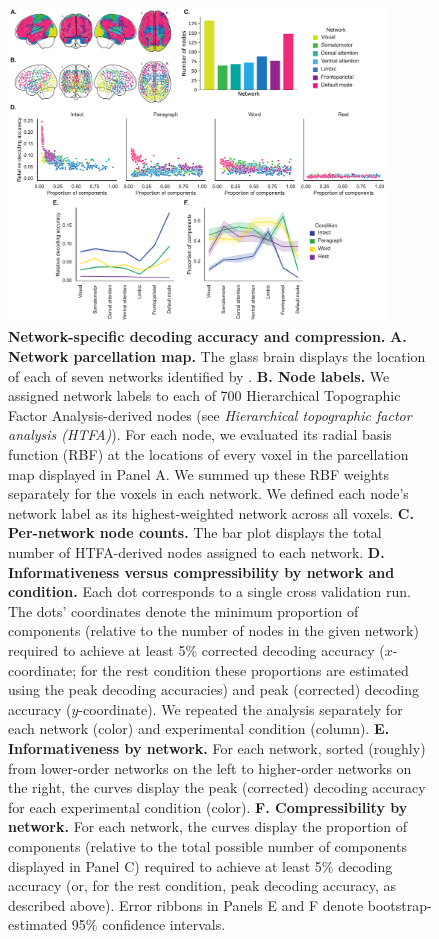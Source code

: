 \documentclass[english, 11pt]{article}
\begin{document}
\begin{figure}[tp]
  \centering
  \includegraphics[width=0.9\textwidth]{figs/network_results}

  \caption{\textbf{Network-specific decoding accuracy and compression.}
  \textbf{A. Network parcellation map.} The glass brain displays the location
  of each of seven networks identified by \cite{YeoEtal11}. \textbf{B. Node
  labels.} We assigned network labels to each of 700 Hierarchical Topographic
  Factor Analysis-derived nodes (see \textit{Hierarchical topographic factor
  analysis (HTFA)}). For each node, we evaluated its radial basis function
  (RBF) at the locations of every voxel in the parcellation map displayed in
  Panel A. We summed up these RBF weights separately for the voxels in each
  network. We defined each node's network label as its highest-weighted network
  across all voxels. \textbf{C. Per-network node counts.} The bar plot displays
  the total number of HTFA-derived nodes assigned to each network. \textbf{D.
  Informativeness versus compressibility by network and condition.} Each dot
  corresponds to a single cross validation run. The dots' coordinates denote
  the minimum proportion of components (relative to the number of nodes in the
  given network) required to achieve at least 5\% corrected decoding accuracy
  ($x$-coordinate; for the rest condition these proportions are estimated using
  the peak decoding accuracies) and peak (corrected) decoding accuracy
  ($y$-coordinate). We repeated the analysis separately for each network
  (color) and experimental condition (column). \textbf{E. Informativeness by
  network.} For each network, sorted (roughly) from lower-order networks on the
  left to higher-order networks on the right, the curves display the peak
  (corrected) decoding accuracy for each experimental condition (color).
  \textbf{F. Compressibility by network.} For each network, the curves display
  the proportion of components (relative to the total possible number of
  components displayed in Panel C) required to achieve at least 5\% decoding
  accuracy (or, for the rest condition, peak decoding accuracy, as described
  above). Error ribbons in Panels E and F denote bootstrap-estimated
  95\% confidence intervals.}

  \label{fig:networks}
\end{figure}
\end{document}
